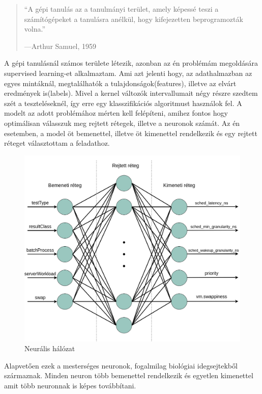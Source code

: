 \begin{quote}
``A gépi tanulás az a tanulmányi terület, amely képessé teszi a számítógépeket a tanulásra
anélkül, hogy kifejezetten beprogramozták volna.''
\par\nobreak\smallskip\hfill—Arthur Samuel, 1959
\end{quote}

A gépi tanulásnál számos területe létezik, azonban az én problémám megoldására supervised learning-et alkalmaztam. Ami azt jelenti hogy, az adathalmazban az egyes mintáknál, megtalálhatók a tulajdonságok(features), illetve az elvárt eredmények is(labels).
Mivel a kernel változók intervallumait négy részre szedtem szét a teszteléseknél, így erre egy klasszifikációs algoritmust használok fel.
A modelt az adott problémához mérten kell felépíteni, amihez fontos hogy optimálisan válasszuk meg rejtett rétegek, illetve a neuronok számát.
Az én esetemben, a model öt bemenettel, illetve öt kimenettel rendelkezik és egy rejtett réteget választottam a feladathoz.

\begin{figure}[h!]
\centering
\includegraphics[scale=0.3]{images/neuralNetwork.png}
\caption{Neurális hálózat}
\label{fig:neuralnetwork}
\end{figure}

Alapvetően ezek a mesterséges neuronok, fogalmilag biológiai idegsejtekből származnak.
Minden neuron több bemenettel rendelkezik és egyetlen kimenettel amit több neuronnak is képes továbbítani.


